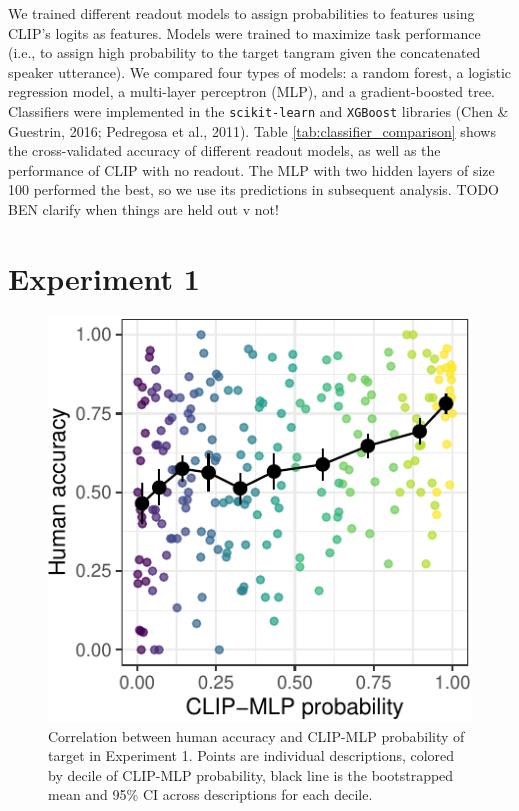 \documentclass[10pt, letterpaper]{article}
\begin{document}
We trained different readout models to assign probabilities to features
using CLIP's logits as features. Models were trained to maximize task
performance (i.e., to assign high probability to the target tangram
given the concatenated speaker utterance). We compared four types of
models: a random forest, a logistic regression model, a multi-layer
perceptron (MLP), and a gradient-boosted tree. Classifiers were
implemented in the \texttt{scikit-learn} and \texttt{XGBoost} libraries
(Chen \& Guestrin, 2016; Pedregosa et al., 2011). Table
\ref{tab:classifier_comparison} shows the cross-validated accuracy of
different readout models, as well as the performance of CLIP with no
readout. The MLP with two hidden layers of size 100 performed the best,
so we use its predictions in subsequent analysis. TODO BEN clarify when
things are held out v not!

\section{Experiment 1}\label{experiment-1}

\begin{CodeChunk}
\begin{figure}[t]

{\centering \includegraphics[width=0.7\linewidth]{figs/fig-calibration-1} 

}

\caption[Correlation between human accuracy and CLIP-MLP probability of target in Experiment 1]{Correlation between human accuracy and CLIP-MLP probability of target in Experiment 1.  Points are individual descriptions, colored by decile of CLIP-MLP probability, black line is the bootstrapped mean and 95\% CI across descriptions for each decile. \label{calibration}}\label{fig:fig-calibration}
\end{figure}
\end{CodeChunk}
\end{document}
